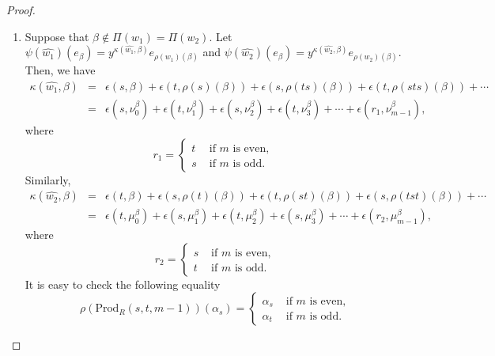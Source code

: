 \documentclass[12pt]{amsart}
\numberwithin{equation}{section}
\begin{document}
\begin{proof}
\begin{enumerate}
\item[Case (3c)] Suppose that $\beta \not\in \Pi(w_1) =\Pi(w_2)$. Let $\psi(\widehat{w_1})(e_{\beta})=y^{\kappa(\widehat{w_1}, \beta)} e_{\rho(w_1)(\beta)}$ and $\psi(\widehat{w_2})(e_{\beta})=y^{\kappa(\widehat{w_2}, \beta)} e_{\rho(w_2)(\beta)}$. Then, we have
\begin{eqnarray*}
\kappa(\widehat{w_1}, \beta) &=& \epsilon(s,\beta) + \epsilon(t,\rho(s)(\beta))+\epsilon(s,\rho(ts)(\beta))+\epsilon(t,\rho(sts)(\beta))+\cdots\\
&=& \epsilon(s,\nu^\beta_0)+ \epsilon(t,\nu^\beta_1)+\epsilon(s,\nu^\beta_2)+\epsilon(t,\nu^\beta_3)+\cdots +\epsilon(r_1,\nu^\beta_{m-1}),
\end{eqnarray*}
where
$$r_1=\begin{cases} t &\text{ if } m \text{ is even, }\\
s &\text{ if } m \text{ is odd. }
 \end{cases}$$
Similarly,
\begin{eqnarray*}
\kappa(\widehat{w_2}, \beta) &=& \epsilon(t,\beta) + \epsilon(s,\rho(t)(\beta))+\epsilon(t,\rho(st)(\beta))+\epsilon(s,\rho(tst)(\beta))+\cdots\\
&=& \epsilon(t,\mu^\beta_0)+ \epsilon(s,\mu^\beta_1)+\epsilon(t,\mu^\beta_2)+\epsilon(s,\mu^\beta_3)+\cdots +\epsilon(r_2,\mu^\beta_{m-1}),
\end{eqnarray*}
where
$$r_2=\begin{cases} s &\text{ if } m \text{ is even,}\\
t &\text{ if } m \text{ is odd. } 
\end{cases}$$
It is easy to check the following equality \cite[p.197, Claim 1(3)]{MR4753773}
\begin{equation}\label{prod st m-1action on s}
\rho(\text{Prod}_{R}(s,t,m-1))(\alpha_s)=\begin{cases}
\alpha_s & \text{ if } m \text{ is even,}\\
\alpha_t & \text{ if } m \text{ is odd.}
\end{cases}
\end{equation}


\end{enumerate}
\end{proof}
\end{document}
